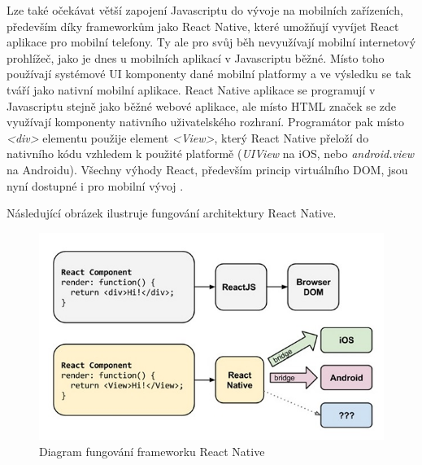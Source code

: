 Lze také očekávat větší zapojení Javascriptu do vývoje na mobilních zařízeních, především díky frameworkům jako React Native, které umožňují vyvíjet React aplikace pro mobilní telefony. Ty ale pro svůj běh nevyužívají mobilní internetový prohlížeč, jako je dnes u mobilních aplikací v Javascriptu běžné. Místo toho používají systémové UI komponenty dané mobilní platformy a ve výsledku se tak tváří jako nativní mobilní aplikace. React Native aplikace se programují v Javascriptu stejně jako běžné webové aplikace, ale místo HTML značek se zde využívají komponenty nativního uživatelského rozhraní. Programátor pak místo \textit{<div>} elementu použije element \textit{<View>}, který React Native přeloží do nativního kódu vzhledem k použité platformě (\textit{UIView} na iOS, nebo \textit{android.view} na Androidu). Všechny výhody React, především princip virtuálního DOM, jsou nyní dostupné i pro mobilní vývoj \cite{react_native}.

\pagebreak
Následující obrázek ilustruje fungování architektury React Native.
\vspace{0,3cm}
\begin{figure}[h]
\begin{centering}
\includegraphics[scale=0.7]{obrazky/react_native}
\par\end{centering}
\caption{Diagram fungování frameworku React Native \cite{react_native_intro} \label{fig:react_native_intro}}
\end{figure}
\FloatBarrier